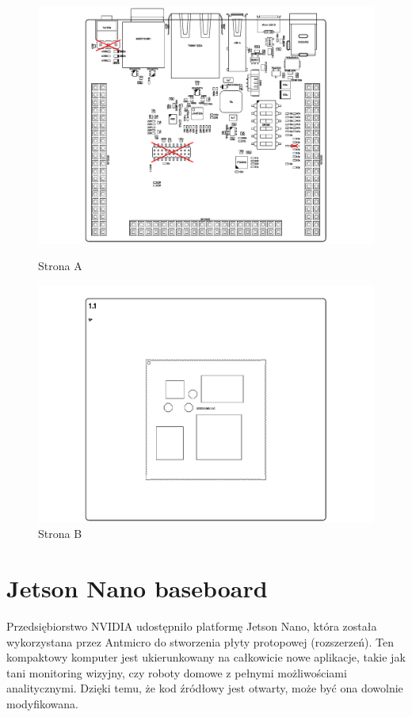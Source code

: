 \begin{figure}[!htb]
	\begin{minipage}{0.5\textwidth}
		\centering
		\includegraphics[width=\linewidth,clip, trim=3cm 0.2cm 3cm 0.1cm]{./chapters/chapter5/chilli_A.pdf}
		\caption{Strona A}\label{chilli:StronaA}
	\end{minipage}\hfill
	\begin{minipage}{0.5\textwidth}
		\centering
		\includegraphics[width=\linewidth,clip, trim=3cm 0.1cm 3cm 0.1cm]{./chapters/chapter5/chilli_B.pdf}
		\caption{Strona B}\label{chilli:StronaB}
	\end{minipage}
\end{figure}

\section{Jetson Nano baseboard}
Przedsiębiorstwo NVIDIA udostępniło platformę Jetson Nano, która została wykorzystana przez Antmicro do stworzenia płyty protopowej (rozszerzeń).
Ten kompaktowy komputer jest ukierunkowany na całkowicie nowe aplikacje, takie jak tani monitoring wizyjny, czy roboty domowe z pełnymi możliwościami analitycznymi.
Dzięki temu, że kod źródłowy jest otwarty, może być ona dowolnie modyfikowana.

